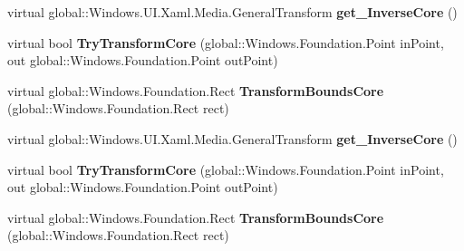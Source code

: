 \begin{DoxyCompactItemize}
\item 
\mbox{\label{class_windows_1_1_u_i_1_1_xaml_1_1_media_1_1_general_transform_ae7e32f7d25e758f47ae50ffc2db532dc}} 
virtual global\+::\+Windows.\+U\+I.\+Xaml.\+Media.\+General\+Transform {\bfseries get\+\_\+\+Inverse\+Core} ()
\item 
\mbox{\label{class_windows_1_1_u_i_1_1_xaml_1_1_media_1_1_general_transform_aa7cc04e60b1e0ab4460a3aa82b822be3}} 
virtual bool {\bfseries Try\+Transform\+Core} (global\+::\+Windows.\+Foundation.\+Point in\+Point, out global\+::\+Windows.\+Foundation.\+Point out\+Point)
\item 
\mbox{\label{class_windows_1_1_u_i_1_1_xaml_1_1_media_1_1_general_transform_a87c2edc3cf75f7b47f399befb5496002}} 
virtual global\+::\+Windows.\+Foundation.\+Rect {\bfseries Transform\+Bounds\+Core} (global\+::\+Windows.\+Foundation.\+Rect rect)
\item 
\mbox{\label{class_windows_1_1_u_i_1_1_xaml_1_1_media_1_1_general_transform_ae7e32f7d25e758f47ae50ffc2db532dc}} 
virtual global\+::\+Windows.\+U\+I.\+Xaml.\+Media.\+General\+Transform {\bfseries get\+\_\+\+Inverse\+Core} ()
\item 
\mbox{\label{class_windows_1_1_u_i_1_1_xaml_1_1_media_1_1_general_transform_aa7cc04e60b1e0ab4460a3aa82b822be3}} 
virtual bool {\bfseries Try\+Transform\+Core} (global\+::\+Windows.\+Foundation.\+Point in\+Point, out global\+::\+Windows.\+Foundation.\+Point out\+Point)
\item 
\mbox{\label{class_windows_1_1_u_i_1_1_xaml_1_1_media_1_1_general_transform_a87c2edc3cf75f7b47f399befb5496002}} 
virtual global\+::\+Windows.\+Foundation.\+Rect {\bfseries Transform\+Bounds\+Core} (global\+::\+Windows.\+Foundation.\+Rect rect)
\item 
\mbox{\label{class_windows_1_1_u_i_1_1_xaml_1_1_media_1_1_general_transform_ae7e32f7d25e758f47ae50ffc2db532dc}} 

\end{DoxyCompactItemize}
